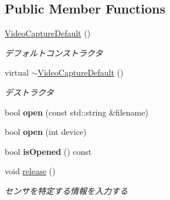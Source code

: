 \subsection*{Public Member Functions}
\begin{DoxyCompactItemize}
\item 
\hypertarget{classskl_1_1_video_capture_default_a1c4eac1dbe596afa16d3663947260004}{}\label{classskl_1_1_video_capture_default_a1c4eac1dbe596afa16d3663947260004} 
\hyperlink{classskl_1_1_video_capture_default_a1c4eac1dbe596afa16d3663947260004}{Video\+Capture\+Default} ()
\begin{DoxyCompactList}\small\item\em デフォルトコンストラクタ \end{DoxyCompactList}\item 
\hypertarget{classskl_1_1_video_capture_default_ab80757b0119e28a212e4e9a7c966c883}{}\label{classskl_1_1_video_capture_default_ab80757b0119e28a212e4e9a7c966c883} 
virtual \hyperlink{classskl_1_1_video_capture_default_ab80757b0119e28a212e4e9a7c966c883}{$\sim$\+Video\+Capture\+Default} ()
\begin{DoxyCompactList}\small\item\em デストラクタ \end{DoxyCompactList}\item 
\hypertarget{classskl_1_1_video_capture_default_ac0898bf274ee0acf05fbbe895229c21b}{}\label{classskl_1_1_video_capture_default_ac0898bf274ee0acf05fbbe895229c21b} 
bool {\bfseries open} (const std\+::string \&filename)
\item 
\hypertarget{classskl_1_1_video_capture_default_afb80319eef496baba0ab45fc1b040ff2}{}\label{classskl_1_1_video_capture_default_afb80319eef496baba0ab45fc1b040ff2} 
bool {\bfseries open} (int device)
\item 
\hypertarget{classskl_1_1_video_capture_default_a6c6045af240272db07a981b605174dff}{}\label{classskl_1_1_video_capture_default_a6c6045af240272db07a981b605174dff} 
bool {\bfseries is\+Opened} () const
\item 
\hypertarget{classskl_1_1_video_capture_default_a4d86ae1172274a23cc401f2ca4116a5c}{}\label{classskl_1_1_video_capture_default_a4d86ae1172274a23cc401f2ca4116a5c} 
void \hyperlink{classskl_1_1_video_capture_default_a4d86ae1172274a23cc401f2ca4116a5c}{release} ()
\begin{DoxyCompactList}\small\item\em センサを特定する情報を入力する \end{DoxyCompactList}\item 

\end{DoxyCompactItemize}
